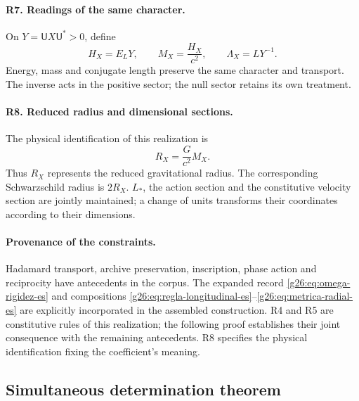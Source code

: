 \paragraph{R7. Readings of the same character.}
On \(Y=\mathsf U X\mathsf U^*>0\), define
\begin{equation}
 H_X=E_{L}Y,\qquad M_X=\frac{H_X}{c^2},\qquad
 \Lambda_X=LY^{-1}.
 \label{g26:eq:lecturas-conjugadas-es}
\end{equation}
Energy, mass and conjugate length preserve the same character and transport. The inverse acts in the positive sector; the null sector retains its own treatment.

\paragraph{R8. Reduced radius and dimensional sections.}
The physical identification of this realization is
\begin{equation}
 R_X=\frac{G}{c^2}M_X.
 \label{g26:eq:radio-reducido-es}
\end{equation}
Thus \(R_X\) represents the reduced gravitational radius. The corresponding Schwarzschild radius is \(2R_X\). \(L_*\), the action section and the constitutive velocity section are jointly maintained; a change of units transforms their coordinates according to their dimensions.

\paragraph{Provenance of the constraints.}
Hadamard transport, archive preservation, inscription, phase action and reciprocity have antecedents in the corpus. The expanded record \eqref{g26:eq:omega-rigidez-es} and compositions \eqref{g26:eq:regla-longitudinal-es}--\eqref{g26:eq:metrica-radial-es} are explicitly incorporated in the assembled construction. R4 and R5 are constitutive rules of this realization; the following proof establishes their joint consequence with the remaining antecedents. R8 specifies the physical identification fixing the coefficient's meaning.

\subsection{Simultaneous determination theorem}

